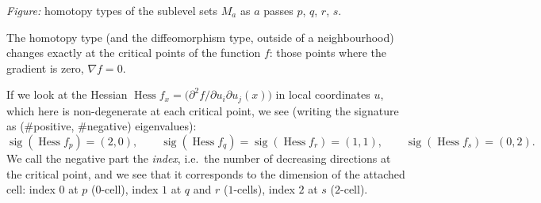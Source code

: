 \documentclass[11pt,openany]{book}
\theoremstyle{plain}
\theoremstyle{definition}
\theoremstyle{remark}
\newcommand{\added}[1]{{\color{addcol}#1}}
\newcommand{\T}{\mathbb{T}}
\newcommand{\Hess}{\operatorname{Hess}}
\begin{document}
\begin{center}
\end{center}
\noindent\textit{Figure:} homotopy types of the sublevel sets $M_a$ as $a$ passes
$p$, $q$, $r$, $s$.

The homotopy type (and the diffeomorphism type, outside of a neighbourhood) changes
exactly at the critical points of the function $f$: those points where the gradient is
zero, $\nabla f=0$.

If we look at the Hessian \added{$\Hess f_x=\big(\partial^2 f/\partial u_i\partial u_j(x)\big)$
in local coordinates $u$}, which here is non-degenerate at each critical point, we see
\added{(writing the signature as (\#positive, \#negative) eigenvalues)}:
\[
  \operatorname{sig}(\Hess f_p)=(2,0),\qquad
  \operatorname{sig}(\Hess f_q)=\operatorname{sig}(\Hess f_r)=(1,1),\qquad
  \operatorname{sig}(\Hess f_s)=(0,2).
\]
We call the negative part the \emph{index}, i.e.\ the number of decreasing directions at the
critical point, and we see that it corresponds to the dimension of the attached cell:
index $0$ at $p$ ($0$-cell), index $1$ at $q$ and $r$ ($1$-cells), index $2$ at $s$
($2$-cell).
\end{document}
